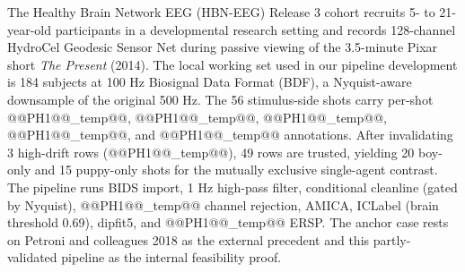 \documentclass[preprint,12pt]{elsarticle}
\begin{document}
\begin{tcolorbox}[colback=yellow!5!white,colframe=black!50,title=Box 1: HBN-EEG Release 3 as the anchor cohort,breakable]
The Healthy Brain Network EEG (HBN-EEG) Release 3 cohort recruits 5- to 21-year-old participants in a developmental research setting and records 128-channel HydroCel Geodesic Sensor Net during passive viewing of the 3.5-minute Pixar short \textit{The Present} (2014). The local working set used in our pipeline development is 184 subjects at 100 Hz Biosignal Data Format (BDF), a Nyquist-aware downsample of the original 500 Hz. The 56 stimulus-side shots carry per-shot @@PH1@@\_temp@@, @@PH1@@\_temp@@, @@PH1@@\_temp@@, @@PH1@@\_temp@@, and @@PH1@@\_temp@@ annotations. After invalidating 3 high-drift rows (@@PH1@@\_temp@@), 49 rows are trusted, yielding 20 boy-only and 15 puppy-only shots for the mutually exclusive single-agent contrast. The pipeline runs BIDS import, 1 Hz high-pass filter, conditional cleanline (gated by Nyquist), @@PH1@@\_temp@@ channel rejection, AMICA, ICLabel (brain threshold 0.69), dipfit5, and @@PH1@@\_temp@@ ERSP. The anchor case rests on Petroni and colleagues 2018 \cite{Petroni2018TheVO} as the external precedent and this partly-validated pipeline as the internal feasibility proof.
\end{tcolorbox}
\end{document}
